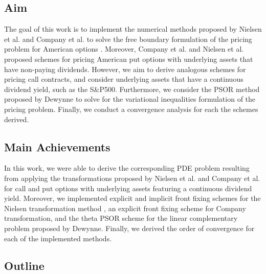 \subsection{Aim} 

The goal of this work is to implement the numerical methods proposed by Nielsen et al. \cite{nielsen_2001} and Company et al.\cite{company_egorova_jodar_2014} to solve the free boundary formulation of the pricing problem for American options \cite{dewynne_howison_rupf_wilmott_1993}. Moreover, Company et al. \cite{company_egorova_jodar_2014} and Nielsen et al.\cite{nielsen_2001} proposed schemes for pricing American put options with underlying assets that have non-paying dividends. However, we aim to derive analogous schemes for pricing call contracts, and consider underlying assets that have a continuous dividend yield, such as the S\&P500.  Furthermore, we consider the PSOR method proposed by Dewynne\cite{dewynne_howison_rupf_wilmott_1993}\cite{wilmott_howison_dewynne_1995} to solve for the variational inequalities formulation of the pricing problem. Finally, we conduct a convergence analysis for each the schemes derived.

\subsection{Main Achievements}

In this work, we were able to derive the corresponding PDE problem resulting from applying the transformations proposed by Nielsen et al.\cite{nielsen_2001} and Company et al.\cite{company_egorova_jodar_2014} for call and put options with underlying assets featuring a continuous dividend yield. Moreover, we implemented explicit and implicit front fixing schemes for the Nielsen transformation method \cite{nielsen_2001}, an explicit front fixing scheme for Company transformation, and the theta PSOR scheme for the linear complementary problem proposed by Dewynne\cite{wilmott_howison_dewynne_1995}. Finally, we derived the order of convergence for each of the implemented methods.

\subsection{Outline}

